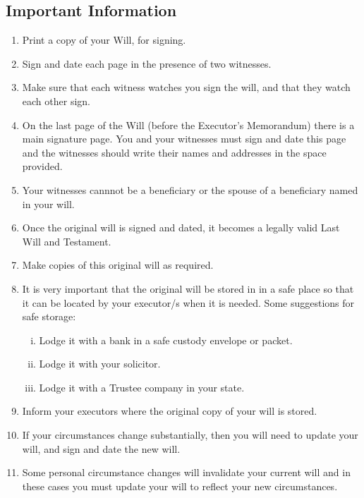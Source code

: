 \documentclass[12pt,a4paper]{article}
\begin{document}
\thispagestyle{empty}
\begin{center}
\section*{Important Information}
\end{center}
\vfill
\begin{enumerate}
	\item Print a copy of your Will, for signing.
	\item Sign and date each page in the presence of two witnesses.
	\item Make sure that each witness watches you sign the will, and that they watch each other sign.
	\item On the last page of the Will (before the Executor's Memorandum) there is a main signature page. You and your witnesses must sign and date this page and the witnesses should write their names and addresses in the space provided.
	\item Your witnesses cannnot be a beneficiary or the spouse of a beneficiary named in your will.
	\item Once the original will is signed and dated, it becomes a legally valid Last Will and Testament.
	\item Make copies of this original will as required.
	\item It is very important that the original will be stored in in a safe place so that it can be located by your executor/s when it is needed. Some suggestions for safe storage:
	\begin{enumerate}[i.]
		\item Lodge it with a bank in a safe custody envelope or packet.
		\item Lodge it with your solicitor.
		\item Lodge it with a Trustee company in your state.
	\end{enumerate}
	\item Inform your executors where the original copy of your will is stored.
	\item If your circumstances change substantially, then you will need to update your will, and sign and date the new will.
	\item Some personal circumstance changes will invalidate your current will and in these cases you must update your will to reflect your new circumstances. 

\end{enumerate}
\end{document}
